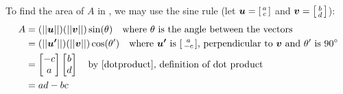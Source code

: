 To find the area of \(A\) in , we may use the sine rule (let \(\vec{u}=\begin{bsmallmatrix}
  a \\
  c
\end{bsmallmatrix} \) and \(\vec{v}=\begin{bsmallmatrix}
  b \\
  d
\end{bsmallmatrix} \)):
\begin{align}
  A &= (||\vec{u}||)(||\vec{v}||)\sin(\theta) \text{\quad where \(\theta\) is the angle between the vectors} \nonumber \\
  &= (||\vec{u'}||)(||\vec{v}||)\cos(\theta') \text{\quad where \(\vec{u'}\) is \(\begin{bsmallmatrix}
    a \\
    -c
  \end{bsmallmatrix} \), perpendicular to \(\vec{v}\) and \(\theta'\) is \(90\degree \)} \nonumber \\
  &= \begin{bmatrix}
    -c \\
    a
  \end{bmatrix} \begin{bmatrix}
    b \\
    d
  \end{bmatrix} \text{\quad by \Cref{dotproduct}, definition of dot product} \nonumber \\
  &= ad - bc
\end{align}


